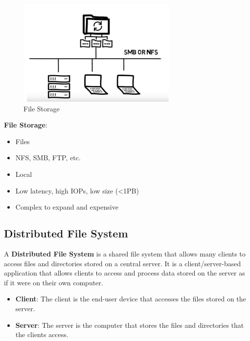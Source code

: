 \begin{minipage}{0.45\textwidth}
    \begin{figure}[H]
        \centering
        \includegraphics[width=0.7\textwidth]{assets/fig41.png}
        \caption{File Storage}
    \end{figure}
\end{minipage}
\begin{minipage}{0.45\textwidth}
    \textbf{File Storage}:
    \begin{itemize}
        \item Files
        \item NFS, SMB, FTP, etc.
        \item Local
        \item Low latency, high IOPs, low size (<1PB)
        \item Complex to expand and expensive 
    \end{itemize}
\end{minipage}

\subsection{Distributed File System}

\begin{definitionblock}
    A \textbf{Distributed File System} is a shared file system that allows many clients to access files and directories stored on a central server. It is a client/server-based application that allows clients to access and process data stored on the server as if it were on their own computer.

    \begin{itemize}
        \item \textbf{Client}: The client is the end-user device that accesses the files stored on the server.
        \item \textbf{Server}: The server is the computer that stores the files and directories that the clients access.
    \end{itemize}
\end{definitionblock}

